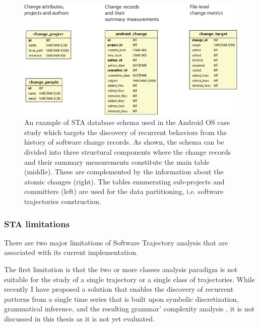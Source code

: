 \begin{figure}[t]
   \centering
   \includegraphics[width=150mm]{figures/sta-schema.eps}
   \caption{An example of STA database schema used in the Android OS case study which targets the discovery of
   recurrent behaviors from the history of software change records. As shown, the schema can be divided into three 
   structural components where the change records and their summary measurements constitute the main table (middle).
   These are complemented by the information about the atomic changes (right). 
   The tables enumerating sub-projects and committers (left) are used for the data partitioning, i.e. software trajectories construction.}
   \label{fig:db-schema}
\end{figure}

\subsubsection{STA limitations}\label{sta_limitations}
There are two major limitations of Software Trajectory analysis that are associated with its current implementation.

The first limitation is that the two or more classes analysis paradigm is not suitable for the study of a single trajectory or a single class of trajectories. While recently I have proposed a solution that enables the discovery of recurrent patterns from a single time series that is built upon symbolic discretization, grammatical inference, and the resulting grammar' complexity analysis \cite{grammarviz2}, it is not discussed in this thesis as it is not yet evaluated.

